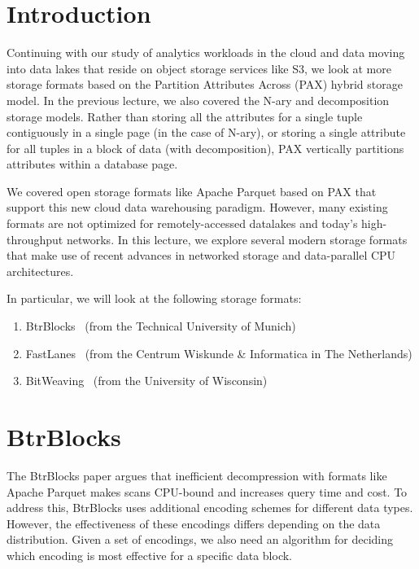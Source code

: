 \documentclass[11pt]{article}
\begin{document}
\maketitle
\thispagestyle{plain}

\section{Introduction}
Continuing with our study of analytics workloads in the cloud and data moving into data lakes that reside on object storage services like S3, we look at more storage formats based on the Partition Attributes Across (PAX) hybrid storage model. In the previous lecture, we also covered the N-ary and decomposition storage models. Rather than storing all the attributes for a single tuple contiguously in a single page (in the case of N-ary), or storing a single attribute for all tuples in a block of data (with decomposition), PAX vertically partitions attributes within a database page.

We covered open storage formats like Apache Parquet based on PAX that support this new cloud data warehousing paradigm. However, many existing formats are not optimized for remotely-accessed datalakes and today's high-throughput networks. In this lecture, we explore several modern
storage formats that make use of recent advances in networked storage and data-parallel CPU architectures.

In particular, we will look at the following storage formats:
\begin{enumerate}
    \item BtrBlocks~\cite{btrblocks} (from the Technical University of Munich)
    \item FastLanes~\cite{fastlanes} (from the Centrum Wiskunde \& Informatica in The Netherlands)
    \item BitWeaving~\cite{bitweaving} (from the University of Wisconsin)
\end{enumerate}

\section{BtrBlocks}
The BtrBlocks paper argues that inefficient decompression with formats like Apache Parquet makes scans CPU-bound and increases query time and cost. To address this, BtrBlocks uses additional encoding schemes for different data types. However, the effectiveness of these encodings differs depending on the data distribution. Given a set of encodings, we also need an algorithm for deciding which encoding is most effective for a specific data block.
\end{document}
